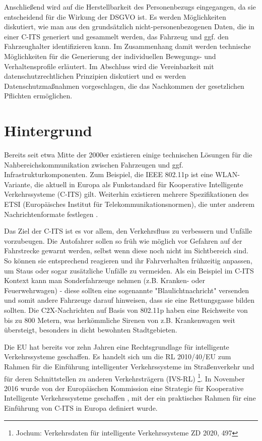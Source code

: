 Anschließend wird auf die Herstellbarkeit des Personenbezugs eingegangen, da sie entscheidend für die Wirkung der DSGVO ist. Es werden Möglichkeiten diskutiert, wie man aus den grundsätzlich nicht-personenbezogenen Daten, die in einer C-ITS generiert und gesammelt werden, das Fahrzeug und ggf. den Fahrzeughalter identifizieren kann. Im Zusammenhang damit werden technische Möglichkeiten für die Generierung der individuellen Bewegungs- und Verhaltensprofile erläutert. Im Abschluss wird die Vereinbarkeit mit datenschutzrechtlichen Prinzipien diskutiert und es werden Datenschutzmaßnahmen vorgeschlagen, die das Nachkommen der gesetzlichen Pflichten ermöglichen.


\section{Hintergrund}
\label{ch:Background}

Bereits seit etwa Mitte der 2000er existieren einige technischen Lösungen für die Nahbereichskommunikation zwischen Fahrzeugen und ggf. Infrastrukturkomponenten. Zum Beispiel, die IEEE 802.11p ist eine WLAN-Variante, die aktuell in Europa als Funkstandard für Kooperative Intelligente Verkehrssysteme (C-ITS) gilt. Weiterhin existieren mehrere Spezifikationen des ETSI (Europäisches Institut für Telekommunikationsnormen), die unter anderem Nachrichtenformate festlegen \cite{Strubbe2017}. 

Das Ziel der C-ITS ist es vor allem, den Verkehrsfluss zu verbessern und Unfälle vorzubeugen. Die Autofahrer sollen so früh wie möglich vor Gefahren auf der Fahrstrecke gewarnt werden, selbst wenn diese noch nicht im Sichtbereich sind. So können sie entsprechend reagieren und ihr Fahrverhalten frühzeitig anpassen, um Staus oder sogar zusätzliche Unfälle zu vermeiden. Als ein Beispiel im C-ITS Kontext kann man Sonderfahrzeuge nehmen (z.B. Kranken- oder Feuerwehrwagen) - diese sollten eine sogenannte "Blaulichtnachricht" versenden und somit andere Fahrzeuge darauf hinweisen, dass sie eine Rettungsgasse bilden sollten. Die C2X-Nachrichten auf Basis von 802.11p haben eine Reichweite von bis zu 800 Metern, was herkömmliche Sirenen von z.B. Krankenwagen weit übersteigt, besonders in dicht bewohnten Stadtgebieten.

Die EU hat bereits vor zehn Jahren eine Rechtsgrundlage für intelligente Verkehrssysteme geschaffen. Es handelt sich um die RL 2010/40/EU zum Rahmen für die Einführung intelligenter Verkehrssysteme im Straßenverkehr und für deren Schnittstellen zu anderen Verkehrsträgern (IVS-RL) \footnote{Jochum: Verkehrsdaten für intelligente Verkehrssysteme ZD 2020, 497}. In November 2016 wurde von der Europäischen Kommission eine Strategie für Kooperative Intelligente Verkehrssysteme geschaffen \cite{CITS2016}, mit der ein praktisches Rahmen für eine Einführung von C-ITS in Europa definiert wurde. 

